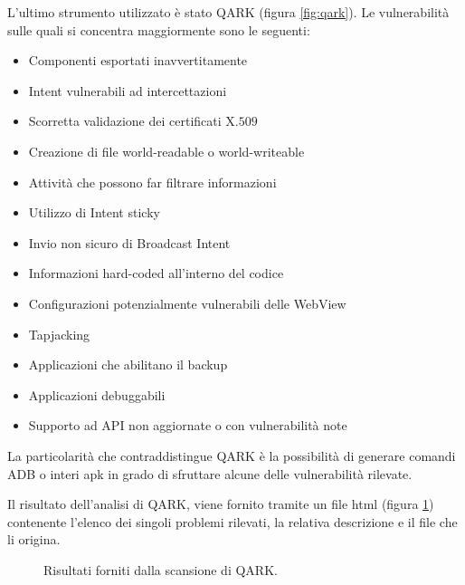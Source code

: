 L'ultimo strumento utilizzato è stato \ac{QARK} \cite{QARK} (figura \ref{fig:qark}). Le vulnerabilità sulle quali si concentra maggiormente sono le seguenti:
\begin{itemize}
	\item Componenti esportati inavvertitamente
	\item Intent vulnerabili ad intercettazioni
	\item Scorretta validazione dei certificati X.$509$
	\item Creazione di file world-readable o world-writeable
	\item Attività che possono far filtrare informazioni
	\item Utilizzo di Intent sticky
	\item Invio non sicuro di Broadcast Intent
	\item Informazioni hard-coded all'interno del codice
	\item Configurazioni potenzialmente vulnerabili delle WebView
	\item Tapjacking
	\item Applicazioni che abilitano il backup
	\item Applicazioni debuggabili
	\item Supporto ad API non aggiornate o con vulnerabilità note
\end{itemize}

La particolarità che contraddistingue QARK è la possibilità di generare comandi \ac{ADB} o interi apk in grado di sfruttare alcune delle vulnerabilità rilevate.

Il risultato dell'analisi di QARK, viene fornito tramite un file html (figura \ref{fig:qarkResults}) contenente l'elenco dei singoli problemi rilevati, la relativa descrizione e il file che li origina.
\begin{figure}[h]
	\centering 
	\caption{Risultati forniti dalla scansione di QARK.}
	\label{fig:qarkResults}
\end{figure}